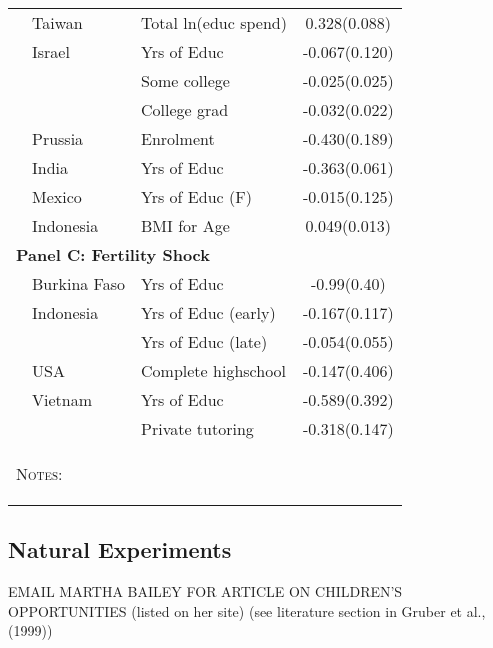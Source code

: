 \begin{table}
\begin{tabular}{lllc}
\citet{Lee2008}                  &Taiwan   &Total ln(educ spend) &0.328(0.088)  \\
\citet{Angristetal2010}          &Israel   &Yrs of Educ          & -0.067(0.120)\\
                                 &         &Some college         & -0.025(0.025)\\
                                 &         &College grad         & -0.032(0.022)\\
\citet{Beckeretal2010}           &Prussia  &Enrolment            & -0.430(0.189)\\
\citet{KumarKugler2011}          &India    &Yrs of Educ          & -0.363(0.061)\\
\citet{FitzsimonsMalde2014}      &Mexico   &Yrs of Educ (F)      & -0.015(0.125)\\ 
\citet{MillimetWang2011}         &Indonesia&BMI for Age          &  0.049(0.013)\\
\midrule
\multicolumn{4}{l}{\textbf{Panel C: Fertility Shock}} \\
\citet{Bougmaetal2015}           &Burkina Faso&Yrs of Educ        &-0.99(0.40)\\ 
\citet{Marlani2008}              &Indonesia   &Yrs of Educ (early)&-0.167(0.117)\\ 
                                 &            &Yrs of Educ (late) &-0.054(0.055)\\
\citet{Hotzetal1997}             &USA         &Complete highschool&-0.147(0.406)\\
\citet{DangRogers2013}           &Vietnam     &Yrs of Educ        &-0.589(0.392)\\
                                 &            &Private tutoring   &-0.318(0.147)\\
\bottomrule
\multicolumn{4}{p{10cm}}{\begin{footnotesize}\textsc{Notes:} \end{footnotesize}}
\end{tabular}     
\end{table}

\subsection{Natural Experiments}
EMAIL MARTHA BAILEY FOR ARTICLE ON CHILDREN'S OPPORTUNITIES (listed on her site)
\citet{OltmansHungerman2012, Gruberetal1999,PopEleches2006,BleakleyLange2009,
RosenzweigZhang2009, Qian2009,Hossain1989}
(see literature section in Gruber et al., (1999))

